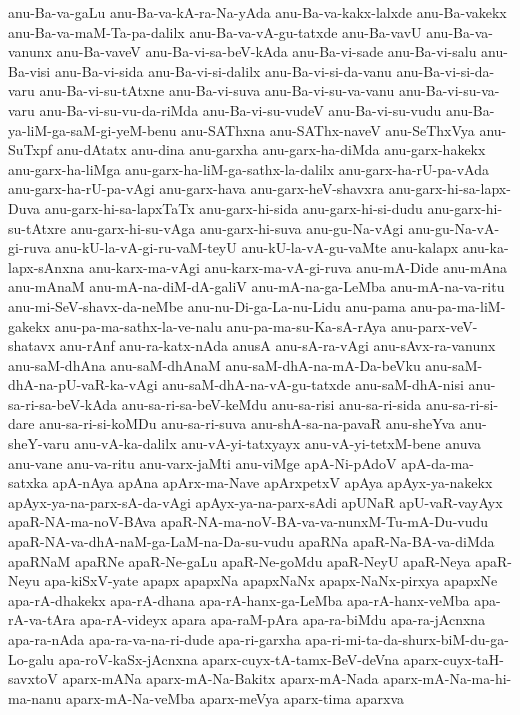 {anu-Ba-va-gaLu
anu-Ba-va-kA-ra-Na-yAda
anu-Ba-va-kakx-lalxde
anu-Ba-vakekx
anu-Ba-va-maM-Ta-pa-dalilx
anu-Ba-va-vA-gu-tatxde
anu-Ba-vavU
anu-Ba-va-vanunx
anu-Ba-vaveV
anu-Ba-vi-sa-beV-kAda
anu-Ba-vi-sade
anu-Ba-vi-salu
anu-Ba-visi
anu-Ba-vi-sida
anu-Ba-vi-si-dalilx
anu-Ba-vi-si-da-vanu
anu-Ba-vi-si-da-varu
anu-Ba-vi-su-tAtxne
anu-Ba-vi-suva
anu-Ba-vi-su-va-vanu
anu-Ba-vi-su-va-varu
anu-Ba-vi-su-vu-da-riMda
anu-Ba-vi-su-vudeV
anu-Ba-vi-su-vudu
anu-Ba-ya-liM-ga-saM-gi-yeM-benu
anu-SAThxna
anu-SAThx-naveV
anu-SeThxVya
anu-SuTxpf
anu-dAtatx
anu-dina
anu-garxha
anu-garx-ha-diMda
anu-garx-hakekx
anu-garx-ha-liMga
anu-garx-ha-liM-ga-sathx-la-dalilx
anu-garx-ha-rU-pa-vAda
anu-garx-ha-rU-pa-vAgi
anu-garx-hava
anu-garx-heV-shavxra
anu-garx-hi-sa-lapx-Duva
anu-garx-hi-sa-lapxTaTx
anu-garx-hi-sida
anu-garx-hi-si-dudu
anu-garx-hi-su-tAtxre
anu-garx-hi-su-vAga
anu-garx-hi-suva
anu-gu-Na-vAgi
anu-gu-Na-vA-gi-ruva
anu-kU-la-vA-gi-ru-vaM-teyU
anu-kU-la-vA-gu-vaMte
anu-kalapx
anu-ka-lapx-sAnxna
anu-karx-ma-vAgi
anu-karx-ma-vA-gi-ruva
anu-mA-Dide
anu-mAna
anu-mAnaM
anu-mA-na-diM-dA-galiV
anu-mA-na-ga-LeMba
anu-mA-na-va-ritu
anu-mi-SeV-shavx-da-neMbe
anu-nu-Di-ga-La-nu-Lidu
anu-pama
anu-pa-ma-liM-gakekx
anu-pa-ma-sathx-la-ve-nalu
anu-pa-ma-su-Ka-sA-rAya
anu-parx-veV-shatavx
anu-rAnf
anu-ra-katx-nAda
anusA
anu-sA-ra-vAgi
anu-sAvx-ra-vanunx
anu-saM-dhAna
anu-saM-dhAnaM
anu-saM-dhA-na-mA-Da-beVku
anu-saM-dhA-na-pU-vaR-ka-vAgi
anu-saM-dhA-na-vA-gu-tatxde
anu-saM-dhA-nisi
anu-sa-ri-sa-beV-kAda
anu-sa-ri-sa-beV-keMdu
anu-sa-risi
anu-sa-ri-sida
anu-sa-ri-si-dare
anu-sa-ri-si-koMDu
anu-sa-ri-suva
anu-shA-sa-na-pavaR
anu-sheYva
anu-sheY-varu
anu-vA-ka-dalilx
anu-vA-yi-tatxyayx
anu-vA-yi-tetxM-bene
anuva
anu-vane
anu-va-ritu
anu-varx-jaMti
anu-viMge
apA-Ni-pAdoV
apA-da-ma-satxka
apA-nAya
apAna
apArx-ma-Nave
apArxpetxV
apAya
apAyx-ya-nakekx
apAyx-ya-na-parx-sA-da-vAgi
apAyx-ya-na-parx-sAdi
apUNaR
apU-vaR-vayAyx
apaR-NA-ma-noV-BAva
apaR-NA-ma-noV-BA-va-va-nunxM-Tu-mA-Du-vudu
apaR-NA-va-dhA-naM-ga-LaM-na-Da-su-vudu
apaRNa
apaR-Na-BA-va-diMda
apaRNaM
apaRNe
apaR-Ne-gaLu
apaR-Ne-goMdu
apaR-NeyU
apaR-Neya
apaR-Neyu
apa-kiSxV-yate
apapx
apapxNa
apapxNaNx
apapx-NaNx-pirxya
apapxNe
apa-rA-dhakekx
apa-rA-dhana
apa-rA-hanx-ga-LeMba
apa-rA-hanx-veMba
apa-rA-va-tAra
apa-rA-videyx
apara
apa-raM-pAra
apa-ra-biMdu
apa-ra-jAcnxna
apa-ra-nAda
apa-ra-va-na-ri-dude
apa-ri-garxha
apa-ri-mi-ta-da-shurx-biM-du-ga-Lo-galu
apa-roV-kaSx-jAcnxna
aparx-cuyx-tA-tamx-BeV-deVna
aparx-cuyx-taH-savxtoV
aparx-mANa
aparx-mA-Na-Bakitx
aparx-mA-Nada
aparx-mA-Na-ma-hi-ma-nanu
aparx-mA-Na-veMba
aparx-meVya
aparx-tima
aparxva
}
